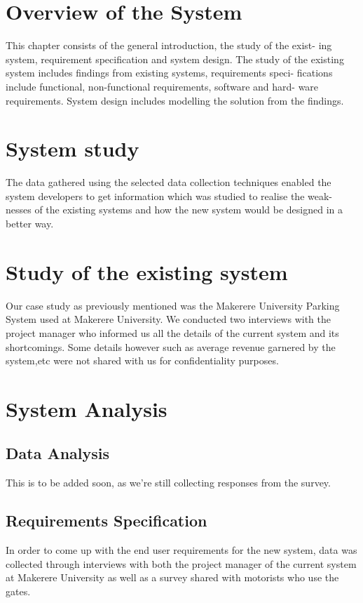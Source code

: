 \section{Overview of the System}
This chapter consists of the general introduction, the study of the exist- ing system, requirement specification and system design. The study of the existing system includes findings from existing systems, requirements speci- fications include functional, non-functional requirements, software and hard- ware requirements. System design includes modelling the solution from the findings.


\section{System study}
The data gathered using the selected data collection techniques enabled the system developers to get information which was studied to realise the weak- nesses of the existing systems and how the new system would be designed in a better way.


\section{Study of the existing system}
Our case study as previously mentioned was the Makerere University Parking System used at Makerere University. We conducted two interviews with the project manager who informed us all the details of the current system and its shortcomings. Some details however such as average revenue garnered by the system,etc were not shared with us for confidentiality purposes.


\section{System Analysis}

\subsection{Data Analysis}
This is to be added soon, as we're still collecting responses from the survey.

\subsection{Requirements Specification}
In order to come up with the end user requirements for the new system, data was collected through interviews with both the project manager of the current system at Makerere University as well as a survey shared with motorists who use the gates.

